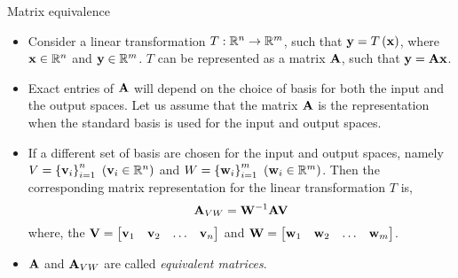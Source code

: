 \documentclass[aspectratio=169]{beamer}
\let\olditem\item
\renewcommand{\item}{\setlength{\itemsep}{\fill}\olditem}
\def\mf{\ensuremath\mathbf}
\def\mb{\ensuremath\mathbb}
\def\lp{\ensuremath\left(}
\def\rp{\ensuremath\right)}
\def\lc{\ensuremath\left\{}
\def\rc{\ensuremath\right\}}
\def\bmx{\ensuremath\begin{bmatrix*}[r]}
\def\emx{\ensuremath\end{bmatrix*}}
\begin{document}
\begin{frame}[t]{Matrix equivalence}
\begin{itemize}
    \item Consider a linear transformation $T:\mb{R}^{n} \to \mb{R}^m$, such that $\mf{y} = T\lp\mf{x}\rp$, where $\mf{x} \in \mb{R}^n$ and $\mf{y} \in \mb{R}^m$. $T$ can be represented as a matrix $\mf{A}$, such that $\mf{y} = \mf{A}\mf{x}$.

    \item Exact entries of $\mf{A}$ will depend on the choice of basis for both the input and the output spaces. Let us assume that the matrix $\mf{A}$ is the representation when the standard basis is used for the input and output spaces.

    \item If a different set of basis are chosen for the input and output spaces, namely $V = \lc\mf{v}_i\rc_{i=1}^{n}\,\,\lp\mf{v}_i \in \mb{R}^n\rp$ and $W = \lc\mf{w}_i\rc_{i=1}^{m}\,\,\lp\mf{w}_i \in \mb{R}^m\rp$. Then the corresponding matrix representation for the linear transformation $T$ is,
    \[ \mf{A}_{VW} = \mf{W}^{-1}\mf{A}\mf{V} \]
    where, the $\mf{V} = \bmx\mf{v}_1 & \mf{v}_2 & \ldots & \mf{v}_n\emx$ and $\mf{W} = \bmx\mf{w}_1 & \mf{w}_2 & \ldots & \mf{w}_m\emx$.

    \item $\mf{A}$ and $\mf{A}_{VW}$ are called \textit{equivalent matrices}.
\end{itemize}
\end{frame}
\end{document}
